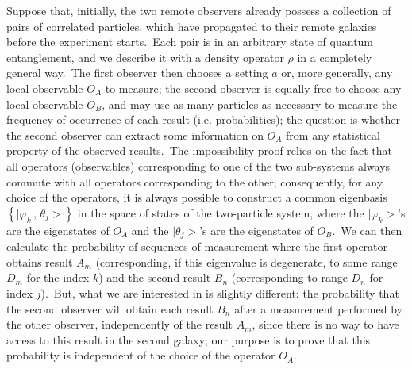 \documentclass[12pt,onecolumn]{article}%
\begin{document}
Suppose that, initially, the two remote observers already possess a collection
of pairs of correlated particles, which have propagated to their remote
galaxies before the experiment starts.\ Each pair is in an arbitrary state of
quantum entanglement, and we describe it with a density operator $\rho$ in a
completely general way.\ The first observer then chooses a setting $a$ or,
more generally, any local observable $O_{A}$ to measure; the second observer
is equally free to choose any local observable $O_{B}$, and may use as many
particles as necessary to measure the frequency of occurrence of each result
(i.e. probabilities); the question is whether the second observer can extract
some information on $O_{A}$ from any statistical property of the observed
results.\ The impossibility proof relies on the fact that all operators
(observables) corresponding to one of the two sub-systems always commute with
all operators corresponding to the other; consequently, for any choice of the
operators, it is always possible to construct a common eigenbasis $\left\{
\mid\varphi_{k}\,,\,\theta_{j}>\right\}  $ in the space of states of the
two-particle system, where the $\mid\varphi_{k}>$'s are the eigenstates of
$O_{A}$ and the $\mid\theta_{j}>$'s are the eigenstates of $O_{B}$.\ We can
then calculate the probability of sequences of measurement where the first
operator obtains result $A_{m}$ (corresponding, if this eigenvalue is
degenerate, to some range $D_{m}$ for the index $k$) and the second result
$B_{n}$ (corresponding to range $D_{n}$ for index $j$).\ But, what we are
interested in is slightly different: the probability that the second observer
will obtain each result $B_{n}$ after a measurement performed by the other
observer, independently of the result $A_{m}$, since there is no way to have
access to this result in the second galaxy; our purpose is to prove that this
probability is independent of the choice of the operator $O_{A}$.
\end{document}
